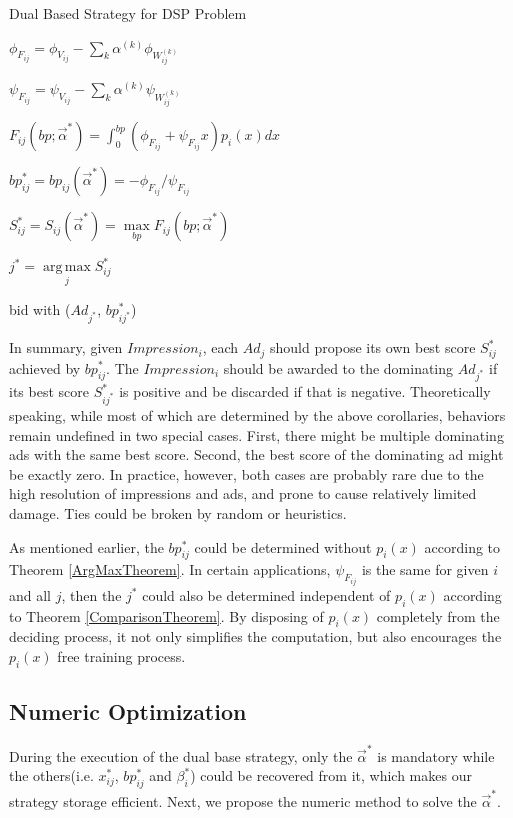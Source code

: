 \documentclass{article}
\DeclareMathOperator*{\argmax}{arg\,max}
\newcommand{\sx}{x_{ij}}
\newcommand{\sbp}{bp_{ij}}
\newcommand{\sV}{V_{ij}}
\newcommand{\sW}{W_{ij}^{(k)}}
\newcommand{\salpha}{\alpha^{(k)}}
\newcommand{\sbeta}{\beta_i}
\newcommand{\sF}{F_{ij}}
\newcommand{\sS}{S_{ij}}
\newcommand{\valpha}{\vec{\alpha}}
\newcommand{\pprob}{\phi}
\newcommand{\pcost}{\psi}
\begin{document}
\begin{algorithm}
\caption{Dual Based Strategy for DSP Problem \label{DSPAlgo}}

{
  {
    $\pprob_{\sF} = \pprob_{\sV} - \sum\limits_k \salpha \pprob_{\sW}$

    $\pcost_{\sF} = \pcost_{\sV} - \sum\limits_k \salpha \pcost_{\sW}$

    $\sF(bp; \valpha^*) = \int_0^{bp} (\pprob_{\sF}+\pcost_{\sF}x)p_i(x)dx$

    $\sbp^* = \sbp(\valpha^*) = -\pprob_{\sF} / \pcost_{\sF}$

    $\sS^* = \sS(\valpha^*) = \max\limits_{bp} \sF(bp; \valpha^*)$
  }
  $j^* = \argmax\limits_j \sS^*$
  
   { bid with ($Ad_{j^*}$, $bp_{ij^*}^*$) }
}
\end{algorithm}

In summary, given $Impression_i$, each $Ad_j$ should propose its own best score $\sS^*$ achieved by $\sbp^*$.
The $Impression_i$ should be awarded to the dominating $Ad_{j^*}$ if its best score $S_{ij^*}^*$ is positive
    and be discarded if that is negative.
Theoretically speaking, while most of which are determined by the above corollaries,
    behaviors remain undefined in two special cases.
First, there might be multiple dominating ads with the same best score.
Second, the best score of the dominating ad might be exactly zero.
In practice, however, both cases are probably rare due to the high resolution of impressions and ads, and prone to cause relatively limited damage.
Ties could be broken by random or heuristics.

As mentioned earlier, the $\sbp^*$ could be determined without $p_i(x)$ according to Theorem \ref{ArgMaxTheorem}.
In certain applications, $\pcost_{\sF}$ is the same for given $i$ and all $j$,
    then the $j^*$ could also be determined independent of $p_i(x)$ according to Theorem \ref{ComparisonTheorem}.
By disposing of $p_i(x)$ completely from the deciding process,
    it not only simplifies the computation, but also encourages the $p_i(x)$ free training process.

\subsection{Numeric Optimization} \label{DSPNumericOptimization}

During the execution of the dual base strategy,
    only the $\valpha^*$ is mandatory
    while the others(i.e. $\sx^*$, $\sbp^*$ and $\sbeta^*$) could be recovered from it,
    which makes our strategy storage efficient.
Next, we propose the numeric method to solve the $\valpha^*$.
\end{document}
